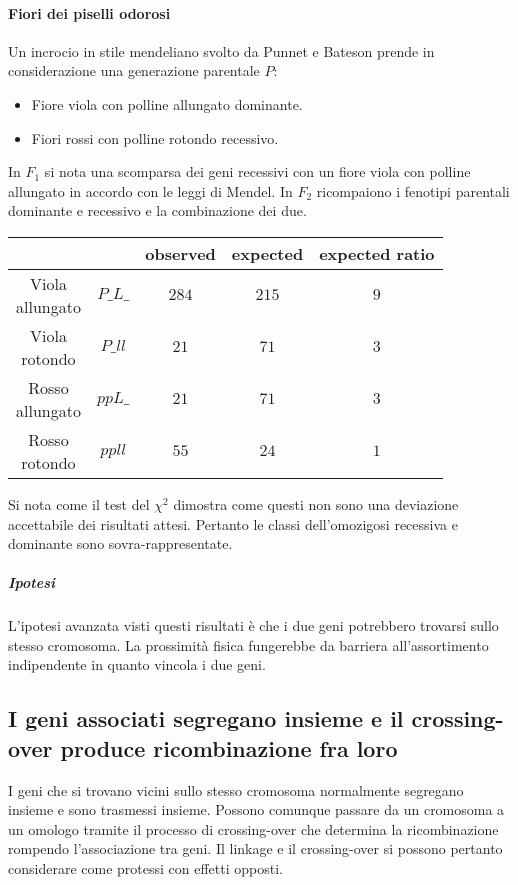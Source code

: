 			\paragraph{Fiori dei piselli odorosi}
			Un incrocio in stile mendeliano svolto da Punnet e Bateson prende in considerazione una generazione parentale $P$:
			\begin{multicols}{2}
				\begin{itemize}
					\item Fiore viola con polline allungato dominante.
					\item Fiori rossi con polline rotondo recessivo.
				\end{itemize}
			\end{multicols}
			In $F_1$ si nota una scomparsa dei geni recessivi con un fiore viola con polline allungato in accordo con le leggi di Mendel.
			In $F_2$ ricompaiono i fenotipi parentali dominante e recessivo e la combinazione dei due.
			\begin{table}[H]
				\centering
				\begin{tabular}{|c|c|c|c|c|}
					\hline
			 		& & observed & expected & expected ratio\\
					\hline
					\makecell{Viola \\ allungato} & $P\_L\_$ & $284$ & $215$ & $9$ \\
					\hline
					\makecell{Viola \\ rotondo} & $P\_ll$ & $21$ & $71$ & $3$ \\
					\hline
					\makecell{Rosso \\ allungato} & $ppL\_$ & $21$ & $71$ & $3$ \\
					\hline
					\makecell{Rosso \\ rotondo} & $ppll$ & $55$ & $24$ & $1$ \\
					\hline
				\end{tabular}
			\end{table}
			Si nota come il test del $\chi^2$ dimostra come questi non sono una deviazione accettabile dei risultati attesi.
			Pertanto le classi dell'omozigosi recessiva e dominante sono sovra-rappresentate.
		
				\subparagraph{Ipotesi}
				L'ipotesi avanzata visti questi risultati \`e che i due geni potrebbero trovarsi sullo stesso cromosoma.
				La prossimit\`a fisica fungerebbe da barriera all'assortimento indipendente in quanto vincola i due geni.
		
	\subsection{I geni associati segregano insieme e il crossing-over produce ricombinazione fra loro}
	I geni che si trovano vicini sullo stesso cromosoma normalmente segregano insieme e sono trasmessi insieme.
	Possono comunque passare da un cromosoma a un omologo tramite il processo di crossing-over che determina la ricombinazione rompendo l'associazione tra geni.
	Il linkage e il crossing-over si possono pertanto considerare come protessi con effetti opposti.

